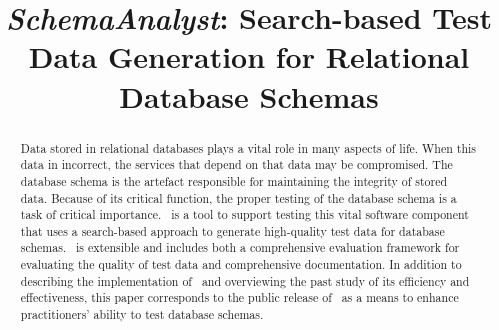 \documentclass[conference]{IEEEtran}
\begin{document}
\title{\textit{SchemaAnalyst}: Search-based Test Data Generation for Relational Database Schemas}

\author{
\and
{}
}
\maketitle

\begin{abstract}

Data stored in relational databases plays a vital role in many aspects of life.  When this data in incorrect, the
services that depend on that data may be compromised.  The database schema is the artefact responsible for maintaining
the integrity of stored data. Because of its critical function, the proper testing of the database schema is a task of
critical importance. \sa~is a tool to support testing this vital software component that uses a search-based approach to
generate high-quality test data for database schemas. \sa~is extensible and includes both a comprehensive evaluation
framework for evaluating the quality of test data and comprehensive documentation. In addition to describing the
implementation of \sa~and overviewing the past study of its efficiency and effectiveness, this paper
corresponds to the public release of \sa~as a means to enhance practitioners' ability to test database schemas.

\end{abstract}

\vspace*{-.05in}










\end{document}
